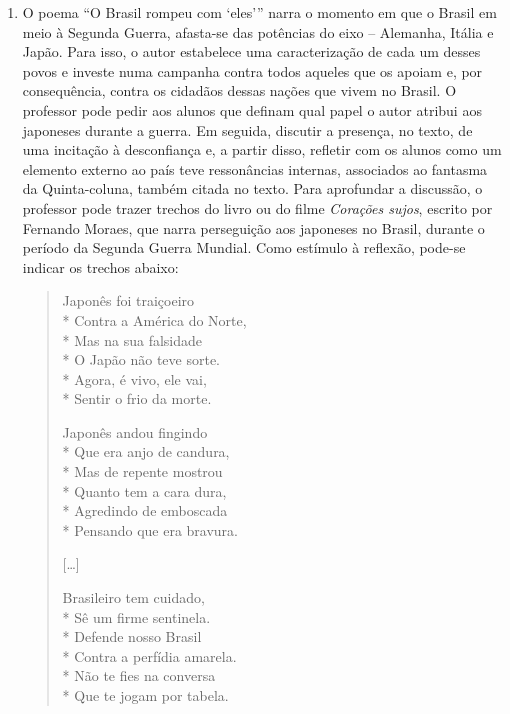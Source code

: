\begin{enumerate}
\item O poema ``O Brasil rompeu com
`eles''' narra o
momento em que o Brasil em meio à Segunda Guerra, afasta-se das
potências do eixo -- Alemanha, Itália e Japão. Para isso, o autor
estabelece uma caracterização de cada um desses povos e investe numa
campanha contra todos aqueles que os apoiam e, por consequência,
contra os cidadãos dessas nações que vivem no Brasil. 
O professor pode pedir aos alunos que definam qual papel o autor
atribui aos japoneses durante a guerra. Em seguida, discutir a presença, no
texto, de uma incitação à desconfiança e, a partir disso, refletir com os
alunos como um elemento externo ao país teve ressonâncias internas,
associados ao fantasma da Quinta-coluna, também citada no texto. Para
aprofundar a discussão, o professor pode trazer trechos do livro ou do
filme \textit{Corações sujos}, escrito
por Fernando Moraes, que narra perseguição aos japoneses no Brasil,
durante o período da Segunda Guerra Mundial.
Como estímulo à reflexão, pode-se indicar os trechos abaixo:


\begin{verse}

Japonês foi traiçoeiro\\*
Contra a América do Norte,\\*
Mas na sua falsidade\\*
O Japão não teve sorte.\\*
Agora, é vivo, ele vai,\\*
Sentir o frio da morte.

Japonês andou fingindo\\*
Que era anjo de candura, \\*
Mas de repente mostrou\\*
Quanto tem a cara dura,\\*
Agredindo de emboscada\\*
Pensando que era bravura.

[\ldots{}]

Brasileiro tem cuidado,\\*
Sê um firme sentinela.\\*
Defende nosso Brasil\\*
Contra a perfídia amarela.\\*
Não te fies na conversa\\*
Que te jogam por tabela.


\end{verse}



\end{enumerate}
